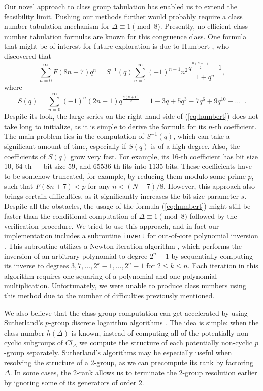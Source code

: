 \documentclass{mcom-l}
\theoremstyle{definition}
\begin{document}
Our novel approach to class group tabulation has enabled us to extend
the feasibility limit.  Pushing our methods further would probably
require a class number tabulation mechanism for $\Delta \equiv 1
\pmod{8}$. Presently, no efficient class number tabulation formulas
are known for this congruence class. One formula that might be of
interest for future exploration is due to Humbert \cite[Section
  6]{watson}, who discovered that
\begin{equation} \label{eq:humbert}
\sum_{n = 0}^\infty F(8n+7)q^n = S^{-1}(q)\sum_{n=1}^\infty(-1)^{n+1}n^2\frac{q^{\frac{n(n+1)}{2}}-1}{1+q^n},
\end{equation} 
where
$$
S(q) = \sum_{n = 0}^\infty(-1)^n(2n+1)q^{\frac{n(n+1)}{2}} = 1 - 3q + 5q^3 - 7q^6 + 9q^{10} - \ldots\,\,\,.
$$
Despite its look, the large series on the right hand side of
(\ref{eq:humbert}) does not take long to initialize, as it is simple
to derive the formula for its $n$-th coefficient. The main problem
lies in the computation of $S^{-1}(q)$, which can take a significant
amount of time, especially if $S(q)$ is of a high degree. Also, the
coefficients of $S(q)$ grow very fast. For example, its 16-th
coefficient has bit size 10, 64-th --- bit size 59, and 65536-th fits
into 1135 bits. These coefficients have to be somehow truncated, for
example, by reducing them modulo some prime $p$, such that $F(8n+7) <
p$ for any $n < (N-7)/8$. However, this approach also brings certain
difficulties, as it significantly increases the bit size parameter
$s$. Despite all the obstacles, the usage of the formula
(\ref{eq:humbert}) might still be faster than the conditional
computation of $\Delta \equiv 1 \pmod{8}$ followed by the verification
procedure. We tried to use this approach, and in fact
our implementation includes a subroutine \texttt{invert} for
out-of-core polynomial inversion \cite{mosunov2}. This subroutine
utilizes a Newton iteration algorithm \cite[Algorithm 9.3]{gathen},
which performs the inversion of an arbitrary polynomial to degree $2^n
- 1$ by sequentially computing its inverse to degrees $3, 7, \ldots,
2^k - 1, \ldots, 2^n - 1$ for $2 \leq k \leq n$. Each iteration in
this algorithm requires one squaring of a polynomial and one
polynomial multiplication. Unfortunately, we were unable to produce
class numbers using this method due to the number of difficulties
previously mentioned.

We also believe that the class group computation can get accelerated
by using Sutherland's $p$-group discrete logarithm algorithms
\cite{sutherland}. The idea is simple: when the class number
$h(\Delta)$ is known, instead of computing all of the potentially
non-cyclic subgroups of $Cl_\Delta$ we compute the structure of each
potentially non-cyclic $p$-group separately. Sutherland's algorithms
may be especially useful when resolving the structure of a 2-group, as
we can precompute its rank by factoring $\Delta$. In some cases, the
2-rank allows us to terminate the 2-group resolution earlier by
ignoring some of its generators of order 2.
\end{document}
